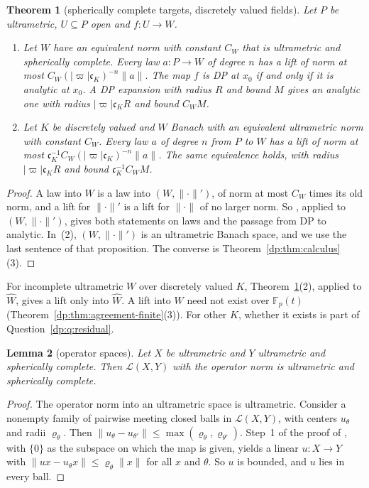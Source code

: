 \documentclass[11pt]{amsart}
\newtheorem{theorem}{Theorem}[section]
\newtheorem{lemma}[theorem]{Lemma}
\theoremstyle{definition}
\theoremstyle{remark}
\numberwithin{equation}{section}
\newcommand{\F}{\mathbb F}
\newcommand{\cL}{\mathcal L}
\newcommand{\abs}[1]{\lvert #1\rvert}
\newcommand{\norm}[1]{\lVert #1\rVert}
\theoremstyle{plain}
\theoremstyle{definition}
\theoremstyle{plain}
\begin{document}
\begin{theorem}[spherically complete targets, discretely valued fields]\label{dp:thm:sph-agreement}
Let $P$ be ultrametric, $U\subseteq P$ open and $f\colon U\to W$.
\begin{enumerate}
\item Let $W$ have an equivalent norm with constant $C_W$ that is ultrametric and spherically complete. Every law $a\colon P\to W$ of degree $n$ has a lift of norm at most $C_W(\abs\varpi\mathfrak c_K)^{-n}\norm a$. The map $f$ is DP at $x_0$ if and only if it is analytic at $x_0$. A DP expansion with radius $R$ and bound $M$ gives an analytic one with radius $\abs\varpi\mathfrak c_KR$ and bound $C_WM$.
\item Let $K$ be discretely valued and $W$ Banach with an equivalent ultrametric norm with constant $C_W$. Every law $a$ of degree $n$ from $P$ to $W$ has a lift of norm at most $\mathfrak c_K^{-1}C_W(\abs\varpi\mathfrak c_K)^{-n}\norm a$. The same equivalence holds, with radius $\abs\varpi\mathfrak c_KR$ and bound $\mathfrak c_K^{-1}C_WM$.
\end{enumerate}
\end{theorem}

\begin{proof}
A law into $W$ is a law into $(W,\norm\cdot')$, of norm at most $C_W$ times its old norm, and a lift for $\norm\cdot'$ is a lift for $\norm\cdot$ of no larger norm. So \cite[Proposition~14.40(1)]{I}, applied to $(W,\norm\cdot')$, gives both statements on laws and the passage from DP to analytic. In~(2), $(W,\norm\cdot')$ is an ultrametric Banach space, and we use the last sentence of that proposition. The converse is Theorem~\ref{dp:thm:calculus}(3).
\end{proof}

For incomplete ultrametric $W$ over discretely valued $K$, Theorem~\ref{dp:thm:sph-agreement}(2), applied to $\widehat W$, gives a lift only into $\widehat W$. A lift into $W$ need not exist over $\F_p(t)$ (Theorem~\ref{dp:thm:agreement-finite}(3)). For other $K$, whether it exists is part of Question~\ref{dp:q:residual}.

\begin{lemma}[operator spaces]\label{dp:lem:operator-sph}
Let $X$ be ultrametric and $Y$ ultrametric and spherically complete. Then $\cL(X,Y)$ with the operator norm is ultrametric and spherically complete.
\end{lemma}

\begin{proof}
The operator norm into an ultrametric space is ultrametric. Consider a nonempty family of pairwise meeting closed balls in $\cL(X,Y)$, with centers $u_\theta$ and radii $\varrho_\theta$. Then $\norm{u_\theta-u_{\theta'}}\le\max(\varrho_\theta,\varrho_{\theta'})$. Step~1 of the proof of \cite[Theorem~5.2]{I}, with $\{0\}$ as the subspace on which the map is given, yields a linear $u\colon X\to Y$ with $\norm{ux-u_\theta x}\le\varrho_\theta\norm x$ for all $x$ and $\theta$. So $u$ is bounded, and $u$ lies in every ball.
\end{proof}
\end{document}
